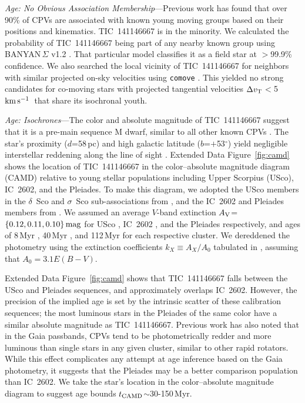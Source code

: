 \documentclass{nature3}
\newcommand{\kms}{\ensuremath{\rm km\,s^{-1}}}
\begin{document}
\begin{methods}
{\it Age: No Obvious Association Membership}---Previous work
\cite{Bouma2024} has found that over 90\% of CPVs are associated with
known young moving groups based on their positions and kinematics.
TIC~141146667 is in the minority.  We calculated the probability of
TIC~141146667 being part of any nearby known group using
BANYAN\,$\Sigma$ v1.2 \cite{Gagne2018}.  That particular model
classifies it as a field star at $>$99.9\% confidence.  We also
searched the local vicinity of TIC~141146667 for neighbors with
similar projected on-sky velocities using \texttt{comove}
\cite{Tofflemire2021}.  This yielded no strong candidates for
co-moving stars with projected tangential velocities $\Delta v_{\rm
T}$$<$5\,\kms\ that share its isochronal youth.

{\it Age: Isochrones}---The color and absolute magnitude of
TIC~141146667 suggest that it is a pre-main sequence M dwarf, similar to
all other known CPVs \cite{Stauffer2017,Stauffer2021,Bouma2024}.  The
star's proximity ($d$=58\,pc) and high galactic latitude
($b$=$+$53$^\circ$) yield negligible interstellar reddening along the
line of sight \cite{Green2019}.  Extended Data Figure~\ref{fig:camd} shows the
location of TIC~141146667 in the color--absolute magnitude diagram
(CAMD) relative to young stellar populations including Upper Scorpius
(USco), IC~2602, and the Pleiades.  To make this diagram, we adopted
the USco members in the $\delta$~Sco and $\sigma$~Sco sub-associations
from \cite{Ratzenbock2023}, and the IC~2602 and Pleiades members from
\cite{Hunt2024}.  We assumed an average $V$-band extinction $A_{\rm
V}$=$\{0.12, 0.11, 0.10\}\,{\rm mag}$ for USco \cite{Pecaut2016},
IC~2602 \cite{Hunt2024}, and the Pleiades \cite{Hunt2024}
respectively, and ages of 8\,Myr \cite{Ratzenbock2023}, 40\,Myr
\cite{Randich2018}, and 112\,Myr \cite{Dahm2015} for each respective
cluster.  We dereddened the photometry using the extinction
coefficients $k_X\equiv A_X/A_0$ tabulated in
\cite{GaiaCollaboration2018}, assuming that $A_0 = 3.1 E(B-V)$.

Extended Data Figure~\ref{fig:camd} shows that TIC~141146667 falls between the USco
and Pleiades sequences, and approximately overlaps IC~2602.  However,
the precision of the implied age is set by the intrinsic scatter of
these calibration sequences; the most luminous stars in the Pleiades of
the same color have a similar absolute magnitude as TIC~141146667.
Previous work \cite{Stauffer2021} has also noted that in the Gaia
passbands, CPVs tend to be photometrically redder and more luminous than
single stars in any given cluster, similar to other rapid rotators.
While this effect complicates any attempt at age inference based on the
Gaia photometry, it suggests that the Pleiades may be a better
comparison population than IC~2602.  We take the star's
location in the color--absolute magnitude diagram to suggest age bounds
$t_{\rm CAMD}$$\sim$30-150\,Myr.



\end{methods}
\end{document}

